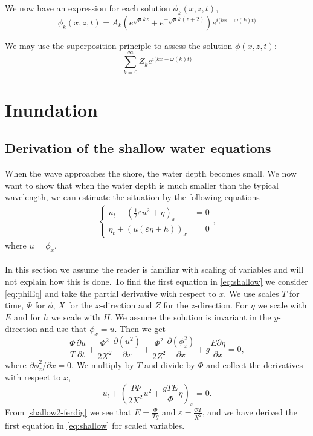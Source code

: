 \documentclass[12pt]{article}
\begin{document}
We now have an expression for each solution $\phi_k(x,z,t)$,
\begin{equation}
\phi_k(x,z,t) = A_k \left( e^{\sqrt{\mu}kz} + e^{-\sqrt{\mu}k(z+2)} \right) e^{i\big( kx - \omega(k)t \big)}
\end{equation}

We may use the superposition principle to assess the solution $\phi(x,z,t)$:
\begin{equation}
\sum_{k=0}^{\infty} Z_k e^{i\big(kx - \omega(k) t \big)}
\end{equation}
%
%
\section{Inundation}
%
%
\subsection{Derivation of the shallow water equations}
When the wave approaches the shore, the water depth becomes small. We now want to show that when the water depth is much smaller than the typical wavelength, we can estimate the situation by the following equations 
\begin{align}
    \label{eq:shallow}
    \begin{cases}
	    u_t + \left(\frac{1}{2}\varepsilon u^2 + \eta\right)_x & = 0 \\
	    \eta_t + (u(\varepsilon\eta + h))_x & = 0
	\end{cases},
\end{align}
where $u = \phi_x$. \\
\\
In this section we assume the reader is familiar with scaling of variables and will not explain how this is done. To find the first equation in \eqref{eq:shallow} we consider \eqref{eq:phiEq} and take the partial derivative
with respect to $x$. We use scales $T$ for time, $\Phi$ for $\phi$, $X$ for the $x$-direction and $Z$ for the $z$-direction. For $\eta$ we scale with $E$ and for $h$ we scale with $H$. We assume the solution is
invariant in the $y$-direction and use that $\phi_x=u$. Then we get 
\begin{equation*}
\frac{\Phi}{T}\frac{\partial u}{\partial t} + \frac{\Phi^2}{2X^2}\frac{\partial (u^2)}{\partial x}+ \frac{\Phi^2}{2Z^2}\frac{\partial(\phi_z^2)}{\partial x} + g\frac{E \partial \eta}{\partial x} = 0,
\end{equation*}
where $\partial\phi_z^2/\partial x=0$. We multiply by $T$ and divide by $\Phi$ and collect the derivatives with respect to $x$,
\begin{equation}
    \label{shallow2-ferdig}
    u_t + \left(\frac{T\Phi}{2X^2}u^2 + \frac{gTE}{\Phi}\eta\right)_x = 0.
\end{equation}
From \eqref{shallow2-ferdig} we see that $E = \frac{\Phi}{T g}$ and $\varepsilon =\frac{\Phi T}{X^2}$, and we have derived the first equation in \eqref{eq:shallow} for scaled variables.
%
%
\end{document}
